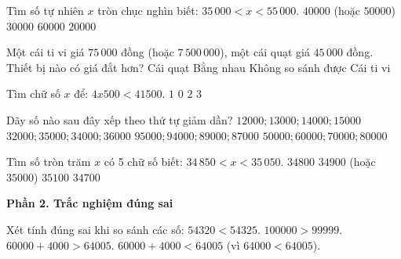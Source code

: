 \begin{ex} %
Tìm số tự nhiên $x$ tròn chục nghìn biết: $35\,000 < x < 55\,000$.
\choice
{\True $40000$ (hoặc $50000$)}
{$30000$}
{$60000$}
{$20000$}
\end{ex}

\begin{ex} %
Một cái ti vi giá $75\,000$ đồng (hoặc $7\,500\,000$), một cái quạt giá $45\,000$ đồng. Thiết bị nào có giá đắt hơn?
\choice
{Cái quạt}
{Bằng nhau}
{Không so sánh được}
{\True Cái ti vi}
\end{ex}

\begin{ex} %
Tìm chữ số $x$ để: $4x500 < 41500$.
\choice
{$1$}
{\True $0$}
{$2$}
{$3$}
\end{ex}

\begin{ex} %
Dãy số nào sau đây xếp theo thứ tự giảm dần?
\choice
{$12000; 13000; 14000; 15000$}
{$32000; 35000; 34000; 36000$}
{\True $95000; 94000; 89000; 87000$}
{$50000; 60000; 70000; 80000$}
\end{ex}

\begin{ex} %
Tìm số tròn trăm $x$ có 5 chữ số biết: $34\,850 < x < 35\,050$.
\choice
{$34800$}
{\True $34900$ (hoặc $35000$)}
{$35100$}
{$34700$}
\end{ex}

\textbf{Phần 2. Trắc nghiệm đúng sai}

\begin{ex} %
Xét tính đúng sai khi so sánh các số:
\choiceTF
{\True $54320 < 54325$.}
{\True $100000 > 99999$.}
{$60000 + 4000 > 64005$.}
{\True $60000 + 4000 < 64005$ (vì $64000 < 64005$).}
\end{ex}

